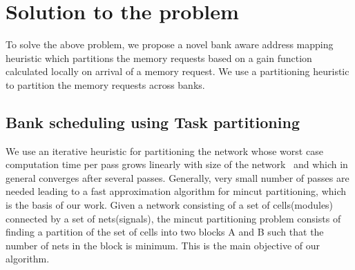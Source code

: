 \section{Solution to the problem}\label{sttp}
\noindent
To solve the above problem, we propose a novel bank aware address mapping heuristic which partitions the memory requests based on 
a gain function calculated locally on arrival of a memory request. We use a partitioning heuristic to partition the memory requests across banks. 

\subsection{Bank scheduling using Task partitioning}\label{FM}
\noindent
We use an iterative heuristic for partitioning the network whose worst case computation time per pass 
grows linearly with size of the network~\cite{fiduccia1988linear} and which in general converges after several passes. 
Generally, very small number of passes are needed leading to a fast approximation algorithm for mincut partitioning, which is the basis of our work.  
\newline
\newline
Given a network consisting of a set of cells(modules) connected by a set of nets(signals), the mincut partitioning problem
consists of finding a partition of the set of cells into two blocks A and B such that the number of nets in the block is 
minimum. This is the main objective of our algorithm. 

